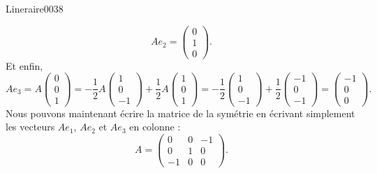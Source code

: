 \begin{corrige}{Lineraire0038}
\begin{enumerate}
\begin{equation}
		Ae_2=\begin{pmatrix}
			0	\\ 
			1	\\ 
			0	
		\end{pmatrix}.
	\end{equation}
	Et enfin,
	\begin{equation}
		Ae_3=A\begin{pmatrix}
			0	\\ 
			0	\\ 
			1	
		\end{pmatrix}=-\frac{ 1 }{2}A\begin{pmatrix}
			1	\\ 
			0	\\ 
			-1	
		\end{pmatrix}+\frac{ 1 }{2}A\begin{pmatrix}
			1	\\ 
			0	\\ 
			1	
		\end{pmatrix}=
		-\frac{ 1 }{2}\begin{pmatrix}
			1	\\ 
			0	\\ 
			-1	
		\end{pmatrix}+\frac{ 1 }{2}\begin{pmatrix}
			-1	\\ 
			0	\\ 
			-1	
		\end{pmatrix}=\begin{pmatrix}
			-1	\\ 
			0	\\ 
			0	
		\end{pmatrix}.
	\end{equation}
	Nous pouvons maintenant écrire la matrice de la symétrie en écrivant simplement les vecteurs $Ae_1$, $Ae_2$ et $Ae_3$ en colonne :
	\begin{equation}
		A=\begin{pmatrix}
			0	&	0	&	-1	\\
			0	&	1	&	0	\\
			-1	&	0	&	0
		\end{pmatrix}.
	\end{equation}
	


\end{enumerate}
\end{corrige}
